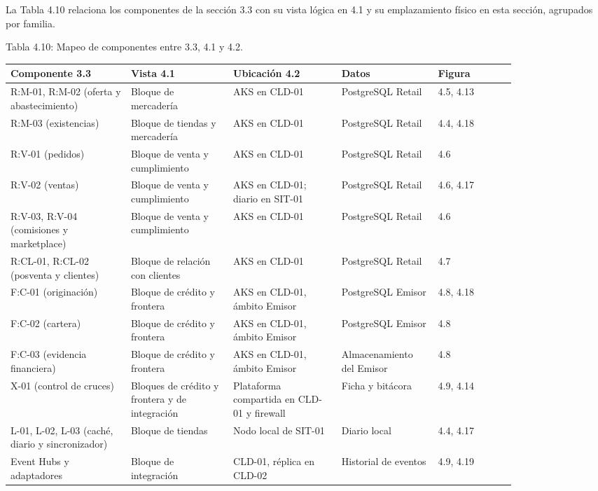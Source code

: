 \documentclass[11pt]{article}
\begin{document}
La Tabla 4.10 relaciona los componentes de la sección 3.3 con su vista lógica en 4.1 y su emplazamiento físico en esta sección, agrupados por familia.

\par\vspace{0pt plus 10\baselineskip}\vspace{0pt plus -10\baselineskip}

Tabla 4.10: Mapeo de componentes entre 3.3, 4.1 y 4.2.\par\nopagebreak
\begin{longtable}{@{}p{0.20\linewidth}p{0.17\linewidth}p{0.18\linewidth}p{0.16\linewidth}p{0.13\linewidth}@{}}
\toprule Componente 3.3 & Vista 4.1 & Ubicación 4.2 & Datos & Figura \\
\midrule\endhead\bottomrule\endlastfoot
R:M-01, R:M-02 (oferta y abastecimiento) & Bloque de mercadería & AKS en CLD-01 & PostgreSQL Retail & 4.5, 4.13 \\
R:M-03 (existencias) & Bloque de tiendas y mercadería & AKS en CLD-01 & PostgreSQL Retail & 4.4, 4.18 \\
R:V-01 (pedidos) & Bloque de venta y cumplimiento & AKS en CLD-01 & PostgreSQL Retail & 4.6 \\
R:V-02 (ventas) & Bloque de venta y cumplimiento & AKS en CLD-01; diario en SIT-01 & PostgreSQL Retail & 4.6, 4.17 \\
R:V-03, R:V-04 (comisiones y marketplace) & Bloque de venta y cumplimiento & AKS en CLD-01 & PostgreSQL Retail & 4.6 \\
R:CL-01, R:CL-02 (posventa y clientes) & Bloque de relación con clientes & AKS en CLD-01 & PostgreSQL Retail & 4.7 \\
F:C-01 (originación) & Bloque de crédito y frontera & AKS en CLD-01, ámbito Emisor & PostgreSQL Emisor & 4.8, 4.18 \\
F:C-02 (cartera) & Bloque de crédito y frontera & AKS en CLD-01, ámbito Emisor & PostgreSQL Emisor & 4.8 \\
F:C-03 (evidencia financiera) & Bloque de crédito y frontera & AKS en CLD-01, ámbito Emisor & Almacenamiento del Emisor & 4.8 \\
X-01 (control de cruces) & Bloques de crédito y frontera y de integración & Plataforma compartida en CLD-01 y firewall & Ficha y bitácora & 4.9, 4.14 \\
L-01, L-02, L-03 (caché, diario y sincronizador) & Bloque de tiendas & Nodo local de SIT-01 & Diario local & 4.4, 4.17 \\
Event Hubs y adaptadores & Bloque de integración & CLD-01, réplica en CLD-02 & Historial de eventos & 4.9, 4.19 \\

\end{longtable}
\end{document}
